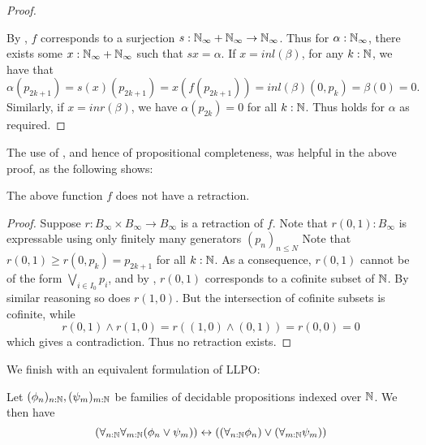 \begin{proof}
\begin{itemize}
  \end{itemize}
  By , $f$ corresponds to a surjection 
  $s:\mathbb{N}_{\infty} + \mathbb{N}_{\infty} \to \mathbb{N}_{\infty}$.
  Thus for $\alpha : \mathbb{N}_{\infty}$, 
  there exists some $x:\mathbb{N}_{\infty} + \mathbb{N}_{\infty}$ such that $s x = \alpha$. 
  If $x = inl(\beta)$, 
  for any $k:\mathbb{N}$, we have that 
  $$\alpha (p_{2k+1}) = s(x) (p_{2k+1}) = x(f(p_{2k+1})) = inl(\beta) (0,p_k)  = \beta(0) = 0.$$
  Similarly, if $x = inr(\beta)$, we have $\alpha(p_{2k}) = 0$ for all $k:\mathbb{N}$. 
  Thus  holds for $\alpha$ as required. 
\end{proof}

The use of , and hence of propositional completeness, 
was helpful in the above proof, as the following shows:
\begin{lemma}
  The above function $f$ does not have a retraction. 
\end{lemma}
\begin{proof}
  Suppose $r:B_\infty \times B_\infty \to B_\infty$ is a retraction of $f$. 
  Note that $r(0,1):B_\infty$ is expressable using only finitely many generators $(p_n)_{n\leq N}$
  Note that $r(0,1) \geq r(0,p_k) = p_{2k+1}$ for all $k:\mathbb{N}$. 
  As a consequence, $r(0,1)$ cannot be of the form $\bigvee_{i\in I_0} p_i$, and by , 
  $r(0,1)$ corresponds to a cofinite subset of $\mathbb{N}$. %
  By similar reasoning so does $r(1,0)$.%
  But the intersection of cofinite subsets is cofinite, while 
  $$r(0,1) \wedge r(1,0) = r( (1,0) \wedge (0,1)) = r(0,0) = 0$$
  which gives a contradiction. Thus no retraction exists. 
\end{proof}

We finish with an equivalent formulation of LLPO:

\begin{lemma}\label{corAlternativeLLPO}
  Let $(\phi_n)_{n:\mathbb{N}}, (\psi_m)_{m:\mathbb{N}}$ be families of decidable propositions indexed over $\mathbb{N}$.
  We then have 
  \begin{equation}
    (\forall_{n:\mathbb{N}} \forall_{m:\mathbb{N}} (\phi_n \vee \psi_m) )
    \leftrightarrow
    ((\forall_{n:\mathbb{N}} \phi_n) \vee (\forall_{m:\mathbb{N}} \psi_m) )
  \end{equation}
\end{lemma}

